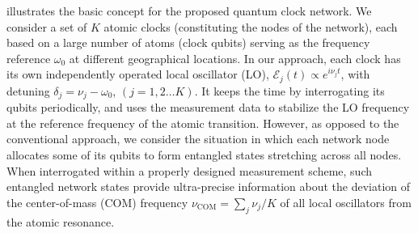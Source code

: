  illustrates the basic concept for the proposed quantum
clock network.
We consider a set of $K$ atomic clocks (constituting the nodes of the network), each based on a large number of atoms (clock
qubits) serving as the frequency reference $\omega_0$ at different geographical
locations. In our approach,  each clock has its own independently operated local
oscillator (LO), $\mathcal{E}_j(t)\propto e^{i\nu_j t}$, with detuning $\delta_j
= \nu_j - \omega_0$, $(j=1,2\dots K)$. It keeps the time by interrogating its
qubits periodically, and uses the measurement data to stabilize the LO frequency
at the reference frequency of the atomic transition. However, as opposed to the
conventional approach, 
we consider the situation in which each network node  allocates some of its
qubits to form entangled states stretching across all nodes. When interrogated
within a properly designed measurement scheme, such entangled network states
provide ultra-precise information about the deviation of the center-of-mass
(COM) frequency $\nu_\textrm{COM} = \sum_j \nu_j/K$ of all local oscillators
from the atomic resonance.  
